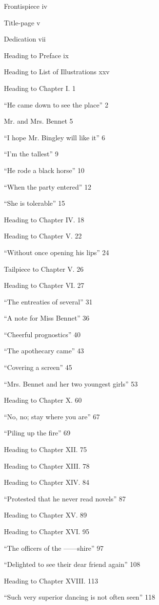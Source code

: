 \documentclass[12pt]{book}
\begin{document}
Frontispiece iv

Title-page v

Dedication vii

Heading to Preface ix

Heading to List of Illustrations xxv

Heading to Chapter I. 1

``He came down to see the place'' 2

Mr. and Mrs. Bennet 5

``I hope Mr. Bingley will like it'' 6

``I'm the tallest'' 9

``He rode a black horse'' 10

``When the party entered'' 12

``She is tolerable'' 15

Heading to Chapter IV. 18

Heading to Chapter V. 22

``Without once opening his lips'' 24

Tailpiece to Chapter V. 26

Heading to Chapter VI. 27

``The entreaties of several'' 31

``A note for Miss Bennet'' 36

``Cheerful prognostics'' 40

``The apothecary came'' 43

``Covering a screen'' 45

``Mrs. Bennet and her two youngest girls'' 53

Heading to Chapter X. 60

``No, no; stay where you are'' 67

``Piling up the fire'' 69

Heading to Chapter XII. 75

Heading to Chapter XIII. 78

Heading to Chapter XIV. 84

``Protested that he never read novels'' 87

Heading to Chapter XV. 89

Heading to Chapter XVI. 95

``The officers of the ------shire'' 97

``Delighted to see their dear friend again'' 108

Heading to Chapter XVIII. 113

``Such very superior dancing is not often seen'' 118
\end{document}
